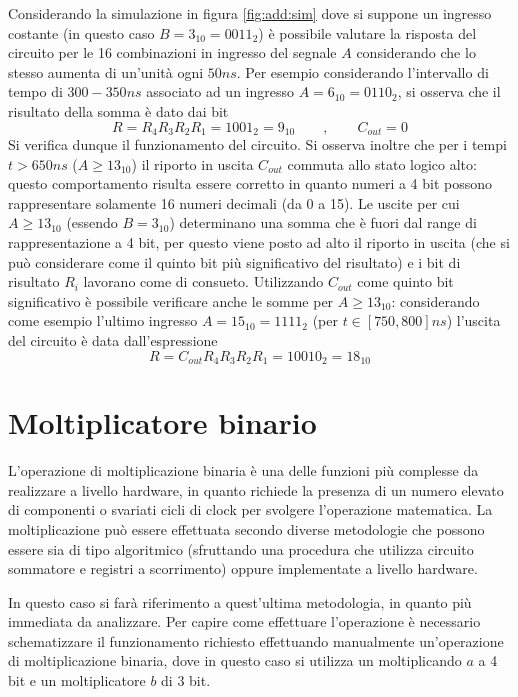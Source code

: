 	Considerando la simulazione in figura \ref{fig:add:sim} dove si suppone un ingresso costante (in questo caso $B=3_{10}=0011_2$) è possibile valutare la risposta del circuito per le 16 combinazioni in ingresso del segnale $A$ considerando che lo stesso aumenta di un'unità ogni $50ns$. Per esempio considerando l'intervallo di tempo di $300-350ns$ associato ad un ingresso $A=6_{10}=0110_2$, si osserva che il risultato della somma è dato dai bit
	\[ R = R_4R_3R_2R_1 = 1001_2 = 9_{10} \qquad, \qquad C_{out} = 0 \]
	Si verifica dunque il funzionamento del circuito. Si osserva inoltre che per i tempi $t > 650ns$ ($A\geq 13_{10}$) il riporto in uscita $C_{out}$ commuta allo stato logico alto: questo comportamento risulta essere corretto in quanto numeri a 4 bit possono rappresentare solamente 16 numeri decimali (da 0 a 15). Le uscite per cui $A\geq 13_{10}$ (essendo $B=3_{10}$) determinano una somma che è fuori dal range di rappresentazione a 4 bit, per questo viene posto ad alto il riporto in uscita (che si può considerare come il quinto bit più significativo del risultato) e i bit di risultato $R_i$ lavorano come di consueto. Utilizzando $C_{out}$ come quinto bit significativo è possibile verificare anche le somme per $A\geq 13_{10}$: considerando come esempio l'ultimo ingresso $A = 15_{10}=1111_2$ (per $t\in [750,800]ns$) l'uscita del circuito è data dall'espressione
	\[ R = C_{out}R_4R_3R_2R_1 = 10010_2 = 18_{10} \]
	
	
\section{Moltiplicatore binario}
	L'operazione di moltiplicazione binaria è una delle funzioni più complesse da realizzare a livello hardware, in quanto richiede la presenza di un numero elevato di componenti o svariati cicli di clock per svolgere l'operazione matematica. La moltiplicazione può essere effettuata secondo diverse metodologie che possono essere sia di tipo algoritmico (sfruttando una procedura che utilizza circuito sommatore e registri a scorrimento) oppure implementate a livello hardware.
	
	In questo caso si farà riferimento a quest'ultima metodologia, in quanto più immediata da analizzare. Per capire come effettuare l'operazione è necessario schematizzare il funzionamento richiesto effettuando manualmente un'operazione di moltiplicazione binaria, dove in questo caso si utilizza un moltiplicando $a$ a 4 bit e un moltiplicatore $b$ di 3 bit.
	
